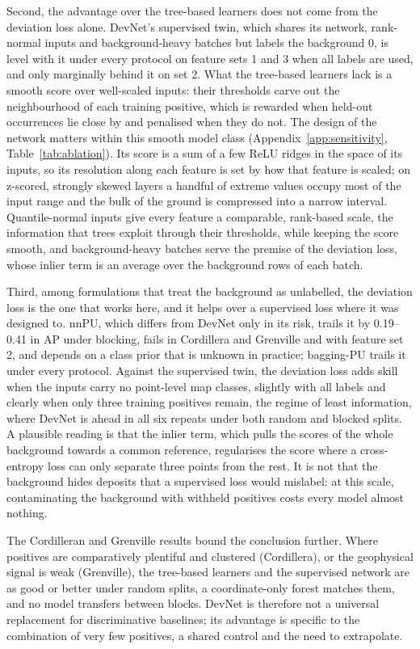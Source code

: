 \documentclass[pdflatex,sn-apa]{sn-jnl}
\begin{document}
Second, the advantage over the tree-based learners does not come from the deviation loss alone. DevNet's supervised twin, which shares its network, rank-normal inputs and background-heavy batches but labels the background 0, is level with it under every protocol on feature sets 1 and 3 when all labels are used, and only marginally behind it on set 2. What the tree-based learners lack is a smooth score over well-scaled inputs: their thresholds carve out the neighbourhood of each training positive, which is rewarded when held-out occurrences lie close by and penalised when they do not. The design of the network matters within this smooth model class (Appendix~\ref{app:sensitivity}, Table~\ref{tab:ablation}). Its score is a sum of a few ReLU ridges in the space of its inputs, so its resolution along each feature is set by how that feature is scaled; on z-scored, strongly skewed layers a handful of extreme values occupy most of the input range and the bulk of the ground is compressed into a narrow interval. Quantile-normal inputs give every feature a comparable, rank-based scale, the information that trees exploit through their thresholds, while keeping the score smooth, and background-heavy batches serve the premise of the deviation loss, whose inlier term is an average over the background rows of each batch.

Third, among formulations that treat the background as unlabelled, the deviation loss is the one that works here, and it helps over a supervised loss where it was designed to. nnPU, which differs from DevNet only in its risk, trails it by 0.19--0.41 in AP under blocking, fails in Cordillera and Grenville and with feature set 2, and depends on a class prior that is unknown in practice; bagging-PU trails it under every protocol. Against the supervised twin, the deviation loss adds skill when the inputs carry no point-level map classes, slightly with all labels and clearly when only three training positives remain, the regime of least information, where DevNet is ahead in all six repeats under both random and blocked splits. A plausible reading is that the inlier term, which pulls the scores of the whole background towards a common reference, regularises the score where a cross-entropy loss can only separate three points from the rest. It is not that the background hides deposits that a supervised loss would mislabel: at this scale, contaminating the background with withheld positives costs every model almost nothing.

The Cordilleran and Grenville results bound the conclusion further. Where positives are comparatively plentiful and clustered (Cordillera), or the geophysical signal is weak (Grenville), the tree-based learners and the supervised network are as good or better under random splits, a coordinate-only forest matches them, and no model transfers between blocks. DevNet is therefore not a universal replacement for discriminative baselines; its advantage is specific to the combination of very few positives, a shared control and the need to extrapolate.
\end{document}
